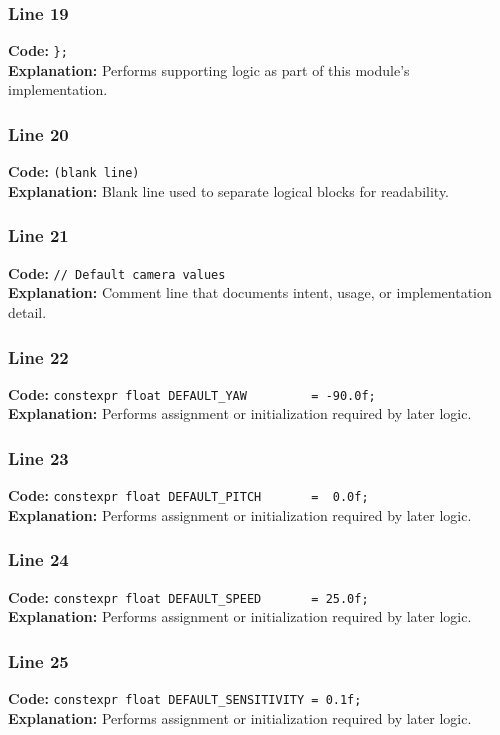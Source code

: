 \documentclass[11pt,a4paper]{article}
\begin{document}
\subsubsection*{Line 19}
\textbf{Code:} \verb|};|\\
\textbf{Explanation:} Performs supporting logic as part of this module's implementation.

\subsubsection*{Line 20}
\textbf{Code:} \texttt{(blank line)}\\
\textbf{Explanation:} Blank line used to separate logical blocks for readability.

\subsubsection*{Line 21}
\textbf{Code:} \verb|// Default camera values|\\
\textbf{Explanation:} Comment line that documents intent, usage, or implementation detail.

\subsubsection*{Line 22}
\textbf{Code:} \verb|constexpr float DEFAULT_YAW         = -90.0f;|\\
\textbf{Explanation:} Performs assignment or initialization required by later logic.

\subsubsection*{Line 23}
\textbf{Code:} \verb|constexpr float DEFAULT_PITCH       =  0.0f;|\\
\textbf{Explanation:} Performs assignment or initialization required by later logic.

\subsubsection*{Line 24}
\textbf{Code:} \verb|constexpr float DEFAULT_SPEED       = 25.0f;|\\
\textbf{Explanation:} Performs assignment or initialization required by later logic.

\subsubsection*{Line 25}
\textbf{Code:} \verb|constexpr float DEFAULT_SENSITIVITY = 0.1f;|\\
\textbf{Explanation:} Performs assignment or initialization required by later logic.
\end{document}
